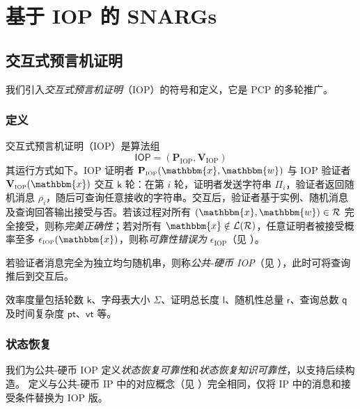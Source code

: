 \documentclass[american,singlepageview]{snargs-book-zh}
\newcommand{\Relation}{\mathcal{R}}
\newcommand{\Language}{\mathcal{L}}
\newcommand{\GetLanguage}[1]{\Language(#1)}
\newcommand{\Instance}{\mathbbm{x}}
\newcommand{\Witness}{\mathbbm{w}}
\newcommand{\ProtoProver}{P}
\newcommand{\ProtoVerifier}{V}
\newcommand{\ProtoSoundnessError}{\epsilon}
\newcommand{\ProtoAlphabet}{\Sigma}
\newcommand{\ProtoRoundComplexity}{\mathsf{k}}
\newcommand{\ProtoProofLength}{\mathsf{l}}
\newcommand{\ProtoQueryComplexity}{\mathsf{q}}
\newcommand{\ProtoRandomnessComplexity}{\mathsf{r}}
\newcommand{\ProtoProverTime}{\mathsf{pt}}
\newcommand{\ProtoVerifierTime}{\mathsf{vt}}
\newcommand{\RoundIndex}{i}
\newcommand{\IOPSymbol}{\mathsf{IOP}}
\newcommand{\IOPSubscript}{\scriptscriptstyle\mathrm{IOP}}
\newcommand{\IOPFormat}[1]{\mathbf{#1}}
\newcommand{\IOPProver}{\IOPFormat{\ProtoProver}_{\IOPSubscript}}
\newcommand{\IOPVerifier}{\IOPFormat{\ProtoVerifier}_{\IOPSubscript}}
\newcommand{\IOPSystem}{(\IOPProver,\IOPVerifier)}
\newcommand{\IOPString}{\Pi}
\newcommand{\IOPVerifierRandomMessage}{\rho}
\newcommand{\IOPSoundnessError}{\ProtoSoundnessError_{\IOPSubscript}}
\newcommand{\IOPRoundComplexity}{\ProtoRoundComplexity}
\newcommand{\IOPAlphabet}{\ProtoAlphabet}
\newcommand{\IOPProofLength}{\ProtoProofLength}
\newcommand{\IOPRandomnessComplexity}{\ProtoRandomnessComplexity}
\newcommand{\IOPQueryComplexity}{\ProtoQueryComplexity}
\newcommand{\IOPProverTime}{\ProtoProverTime}
\newcommand{\IOPVerifierTime}{\ProtoVerifierTime}
\begin{document}
\part{基于 IOP 的 SNARGs}
\label{part:snarg-from-iop}


\chapter{交互式预言机证明}
\label{chapter:iop}

我们引入\emph{交互式预言机证明}（IOP）的符号和定义，它是 PCP 的多轮推广。

\section{定义}
\label{section:iop-definition}

交互式预言机证明（IOP）是算法组
\[
  \IOPSymbol=\IOPSystem
\]
其运行方式如下。IOP 证明者 $\IOPProver(\Instance,\Witness)$ 与 IOP 验证者 $\IOPVerifier(\Instance)$ 交互 $\IOPRoundComplexity$ 轮：在第 $\RoundIndex$ 轮，证明者发送字符串 $\IOPString_{\RoundIndex}$，验证者返回随机消息 $\IOPVerifierRandomMessage_{\RoundIndex}$，随后可查询任意接收的字符串。交互后，验证者基于实例、随机消息及查询回答输出接受与否。若该过程对所有 $(\Instance,\Witness)\in\Relation$ 完全接受，则称\emph{完美正确性}；若对所有 $\Instance\notin\GetLanguage{\Relation}$，任意证明者被接受概率至多 $\IOPSoundnessError(\Instance)$，则称\emph{可靠性错误为} $\IOPSoundnessError$（见 ）。

若验证者消息完全为独立均匀随机串，则称\emph{公共-硬币 IOP}（见 ），此时可将查询推后到交互后。

效率度量包括轮数 $\IOPRoundComplexity$、字母表大小 $\IOPAlphabet$、证明总长度 $\IOPProofLength$、随机性总量 $\IOPRandomnessComplexity$、查询总数 $\IOPQueryComplexity$ 及时间复杂度 $\IOPProverTime$、$\IOPVerifierTime$ 等。

\section{状态恢复}
\label{section:iop-state-restoration}

我们为公共-硬币 IOP 定义\emph{状态恢复可靠性}和\emph{状态恢复知识可靠性}，以支持后续构造。
定义与公共-硬币 IP 中的对应概念（见 ）完全相同，仅将 IP 中的消息和接受条件替换为 IOP 版。
\end{document}
